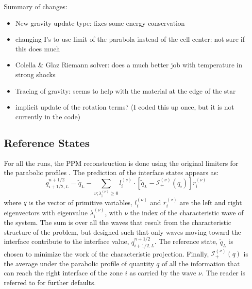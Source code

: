 \documentclass[iop]{emulateapj}
\begin{document}
Summary of changes:
\begin{itemize}
\item New gravity update type: fixes some energy conservation

\item changing I's to use limit of the parabola instead of the
  cell-center: not sure if this does much

\item Colella \& Glaz Riemann solver: does a much better job with
  temperature in strong shocks

\item Tracing of gravity: seems to help with the material at the edge
  of the star

\item implicit update of the rotation terms?  (I coded this up once, but
  it is not currently in the code)
\end{itemize}

\subsection{Reference States}

For all the runs, the PPM reconstruction is done using the original limiters for
the parabolic profiles \citep{ppm}.  The prediction of the interface
states appears as:
\begin{equation}
\label{eq:ppmstatel}
q_{i+1/2,L}^{n+1/2} = \tilde{q}_L -
   \sum_{\nu;\lambda_i^{(\nu)}\ge 0} l_i^{(\nu)} \cdot \left [
        \tilde{q}_L  - \mathcal{I}^{(\nu)}_+(q_i)
       \right ] r_i^{(\nu)}
\end{equation}
where $q$ is the vector of primitive variables, $l_i^{(\nu)}$ and
$r_i^{(\nu)}$ are the left and right eigenvectors with eigenvalue
$\lambda_i^{(\nu)}$, with $\nu$ the index of the characteristic wave of
the system.  The sum is over all the waves that result from the
characteristic structure of the problem, but designed such that only
waves moving toward the interface contribute to the interface value,
$q_{i+1/2,L}^{n+1/2}$.  The reference state, $\tilde{q}_L$ is
chosen to minimize the work of the characteristic projection.
Finally, $\mathcal{I}_+^{(\nu)}(q)$ is the
average under the parabolic profile of quantity $q$ of all the
information that can reach the right interface of the zone $i$ as
carried by the wave $\nu$.  The reader is referred to
\citet{ppmunsplit} for further defaults.
\end{document}
